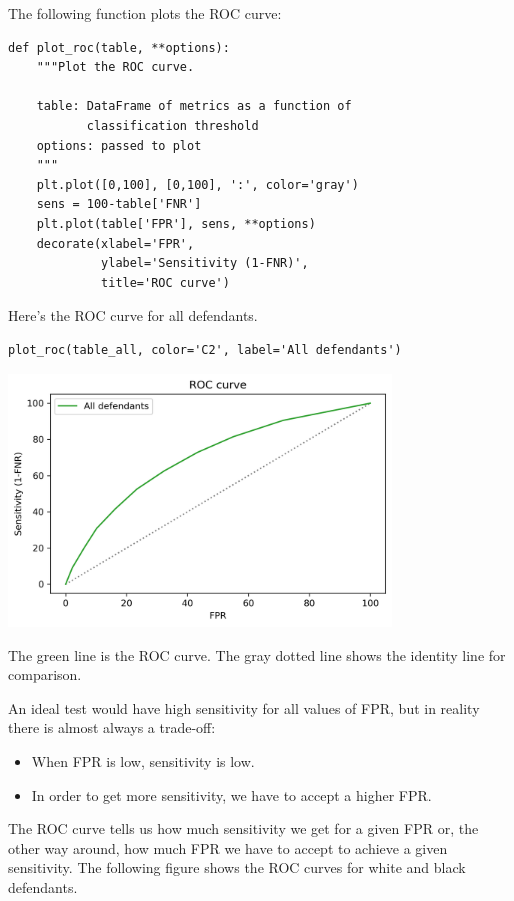 The following function plots the ROC curve:

\begin{lstlisting}[]
def plot_roc(table, **options):
    """Plot the ROC curve.
    
    table: DataFrame of metrics as a function of 
           classification threshold
    options: passed to plot
    """
    plt.plot([0,100], [0,100], ':', color='gray')
    sens = 100-table['FNR']
    plt.plot(table['FPR'], sens, **options)
    decorate(xlabel='FPR',
             ylabel='Sensitivity (1-FNR)',
             title='ROC curve')
\end{lstlisting}

Here's the ROC curve for all defendants.

\begin{lstlisting}[]
plot_roc(table_all, color='C2', label='All defendants')
\end{lstlisting}

\begin{center}
\includegraphics[width=4in]{chapters/02_calibration_files/02_calibration_64_0.png}
\end{center}

The green line is the ROC curve. The gray dotted line shows the identity
line for comparison.

An ideal test would have high sensitivity for all values of FPR, but in
reality there is almost always a trade-off:

\begin{itemize}
\item
  When FPR is low, sensitivity is low.
\item
  In order to get more sensitivity, we have to accept a higher FPR.
\end{itemize}

The ROC curve tells us how much sensitivity we get for a given FPR or,
the other way around, how much FPR we have to accept to achieve a given
sensitivity. The following figure shows the ROC curves for white and
black defendants.

